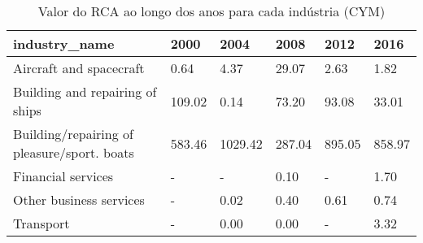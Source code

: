 \begin{table}
\centering
\caption{Valor do RCA ao longo dos anos para cada indústria (CYM)}
\begin{tabular}{p{6cm}p{1.5cm}p{1.5cm}p{1.5cm}p{1.5cm}p{1.5cm}}
\toprule
                              industry\_name &   2000 &    2004 &   2008 &   2012 &   2016 \\
\midrule
                    Aircraft and spacecraft &   0.64 &    4.37 &  29.07 &   2.63 &   1.82 \\
            Building and repairing of ships & 109.02 &    0.14 &  73.20 &  93.08 &  33.01 \\
Building/repairing of pleasure/sport. boats & 583.46 & 1029.42 & 287.04 & 895.05 & 858.97 \\
                         Financial services &      - &       - &   0.10 &      - &   1.70 \\
                    Other business services &      - &    0.02 &   0.40 &   0.61 &   0.74 \\
                                  Transport &      - &    0.00 &   0.00 &      - &   3.32 \\
\bottomrule
\end{tabular}
\end{table}
